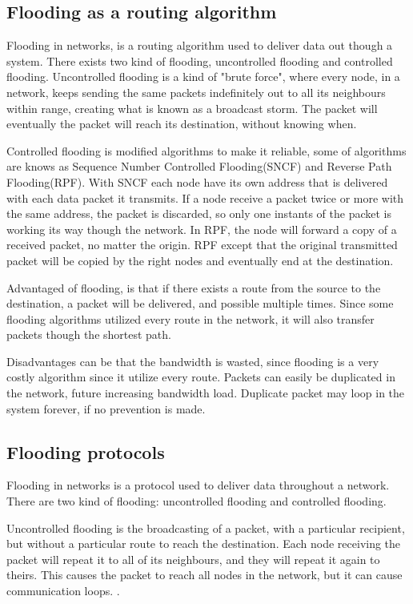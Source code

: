 \subsection{Flooding as a routing algorithm}
Flooding in networks, is a routing algorithm used to deliver data out though a system.
There exists two kind of flooding, uncontrolled flooding and controlled flooding.
Uncontrolled flooding is a kind of "brute force", where every node, in a network, keeps sending the same packets indefinitely out to all its neighbours within range, creating what is known as a broadcast storm.
The packet will eventually the packet will reach its destination, without knowing when\cite{flooding}.

Controlled flooding is modified algorithms to make it reliable, some of algorithms are knows as Sequence Number Controlled Flooding(SNCF) and Reverse Path Flooding(RPF).
With SNCF each node have its own address that is delivered with each data packet it transmits.
If a node receive a packet twice or more with the same address, the packet is discarded, so only one instants of the packet is working its way though the network.
In RPF, the node will forward a copy of a received packet, no matter the origin.
RPF except that the original transmitted packet will be copied by the right nodes and eventually end at the destination\cite{RPF}.

Advantaged of flooding, is that if there exists a route from the source to the destination, a packet will be delivered, and possible multiple times.
Since some flooding algorithms utilized every route in the network, it will also transfer packets though the shortest path\cite{flooding}.

Disadvantages can be that the bandwidth is wasted, since flooding is a very costly algorithm since it utilize every route.
Packets can easily be duplicated in the network, future increasing bandwidth load.
Duplicate packet may loop in the system forever, if no prevention is made\cite{flooding}.

\subsection{Flooding protocols}
Flooding in networks is a protocol used to deliver data throughout a network.
There are two kind of flooding: uncontrolled flooding and controlled flooding.

Uncontrolled flooding is the broadcasting of a packet, with a particular recipient, but without a particular route to reach the destination. Each node receiving the packet will repeat it to all of its neighbours, and they will repeat it again to theirs. This causes the packet to reach all nodes in the network, but it can cause communication loops. \cite{flooding}.

